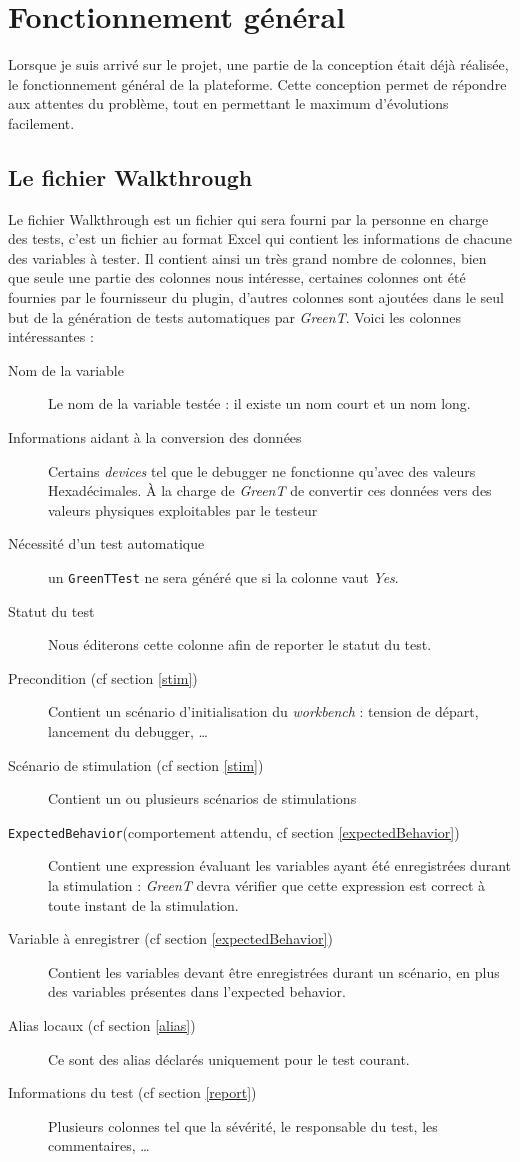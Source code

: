 	\section{Fonctionnement général}
	Lorsque je suis arrivé sur le projet, une partie de la conception était déjà réalisée, le fonctionnement général de la plateforme. Cette conception permet de répondre aux attentes du problème, tout en permettant le maximum d'évolutions facilement.

	\subsection{Le fichier Walkthrough}\label{wt}
		Le fichier Walkthrough est un fichier qui sera fourni par la personne en charge des tests, c'est un fichier au format Excel qui contient les informations
		de chacune des variables à tester. Il contient ainsi un très grand nombre de colonnes, bien que seule une partie des colonnes nous intéresse, certaines colonnes ont été fournies par le fournisseur du plugin, d'autres colonnes sont ajoutées dans le seul but de la génération de tests automatiques par \textit{GreenT}. Voici les colonnes intéressantes : 

		\begin{description} 
			\item[Nom de la variable] Le nom de la variable testée : il existe un nom court et un nom long.
			\item[Informations aidant à la conversion des données] Certains \textit{devices} tel que le debugger ne fonctionne qu'avec des valeurs Hexadécimales. À la charge de \textit{GreenT} de convertir ces données vers des valeurs physiques exploitables par le testeur
			\item[Nécessité d'un test automatique] un \texttt{GreenTTest} ne sera généré que si la colonne vaut \textit{Yes}.
			\item[Statut du test] Nous éditerons cette colonne afin de reporter le statut du test.
			\item[Precondition (cf section \ref{stim})] Contient un scénario d'initialisation du \textit{workbench} : tension de départ, lancement du debugger, \ldots
			\item[Scénario de stimulation (cf section \ref{stim})] Contient un ou plusieurs scénarios de stimulations
			\item[\texttt{ExpectedBehavior}(comportement attendu, cf section \ref{expectedBehavior})] Contient une expression évaluant les variables ayant été enregistrées durant la stimulation : \textit{GreenT} devra vérifier que cette expression est correct à toute instant de la stimulation.
			\item[Variable à enregistrer (cf section \ref{expectedBehavior})] Contient les variables devant être enregistrées durant un scénario, en plus des variables présentes dans l'expected behavior.
			\item[Alias locaux (cf section \ref{alias})] Ce sont des alias déclarés uniquement pour le test courant.
			\item[Informations du test (cf section \ref{report})] Plusieurs colonnes tel que la sévérité, le responsable du test, les commentaires, \ldots
		\end{description}

